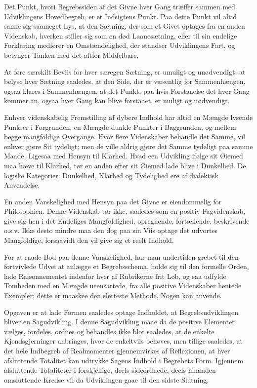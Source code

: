 \documentclass[12pt]{book}
\newcommand{\opage}[1]{\marginnote{\footnotesize\textit{[#1]}}}
\begin{document}
Det Punkt, hvori Begrebssiden af det Givne hver Gang træffer sammen med Udviklingens
Hovedbegreb, er et Indsigtens Punkt. Paa dette Punkt vil altid samle sig saameget Lys, at
den Sætning, der som et Givet optages fra en anden Videnskab, hverken stiller sig som en død
Laanesætning, eller til sin endelige Forklaring medfører en Omstændelighed, der standser
Udviklingens Fart, og betynger Tanken med det altfor Middelbare.

At føre særskilt Beviis for hver særegen Sætning, er umuligt og unødvendigt; at belyse hver
Sætning saaledes, at den Side, der er væsentlig for Sammenhængen, ogsaa klares i
Sammenhængen, at det Punkt, paa hvis Forstaaelse det hver Gang kommer an, ogsaa hver Gang
kan blive forstaaet, er muligt og nødvendigt.

Enhver videnskabelig Fremstilling af dybere Indhold har altid en Mængde lysende Punkter i
Forgrunden, en Mængde dunkle Punkter i Baggrunden, og mellem begge mangfoldige Overgange.
Hvor flere Videnskaber behandle det Samme, vil enhver gjøre Sit tydeligt; men de ville
aldrig gjøre det Samme tydeligt paa samme Maade. Ligesaa med Hensyn til Klarhed. Hvad een
Udvikling ifølge sit
\opage{109} Øiemed maa hæve til Klarhed, tør en anden efter sit Øiemed lade blive i Dunkelhed. De
logiske Kategorier: Dunkelhed, Klarhed og Tydelighed ere af dialektisk Anvendelse.

En anden Vanskelighed med Hensyn paa det Givne er eiendommelig for Philosophien. Denne
Videnskab tør ikke, saaledes som en positiv Fagvidenskab, give sig hen i det Endeliges
Mangfoldighed, opregnende, fortællende, beskrivende o.s.v. Ikke desto mindre maa den dog paa
sin Viis optage det udvortes Mangfoldige, forsaavidt den vil give sig et reelt Indhold.

For at raade Bod paa denne Vanskelighed, har man undertiden grebet til den fortvivlede Udvei
at anlægge et Begrebsschema, holde sig til den formelle Orden, lade Raisonnementet indenfor
hver af Rubrikerne frit Løb, og saa udfylde Tomheden med en Mængde ueensartede, fra alle
positive Videnskaber hentede Exempler; dette er maaskee den sletteste Methode, Nogen kan
anvende.

Opgaven er at lade Formen saaledes optage Indholdet, at Begrebsudviklingen bliver en
Sagudvikling. I denne Sagudvikling maae da de positive Elementer vælges, fordeles, ordnes og
behandles ikke blot saaledes, at de enkelte Kjendsgjerninger anbringes, hvor de enkeltviis
behøves, men tillige saaledes, at det hele Indbegreb af Realmomenter gjennemvirkes af
Reflexionen, at hver afsluttende Totalitet kan udtrykke Sagens Indhold i Begrebets Form.
Igjennem afsluttende Totaliteter i forskjellige, deels sideordnede, deels hinanden
omsluttende Kredse vil da Udviklingen gaae til den sidste Slutning.
\end{document}
